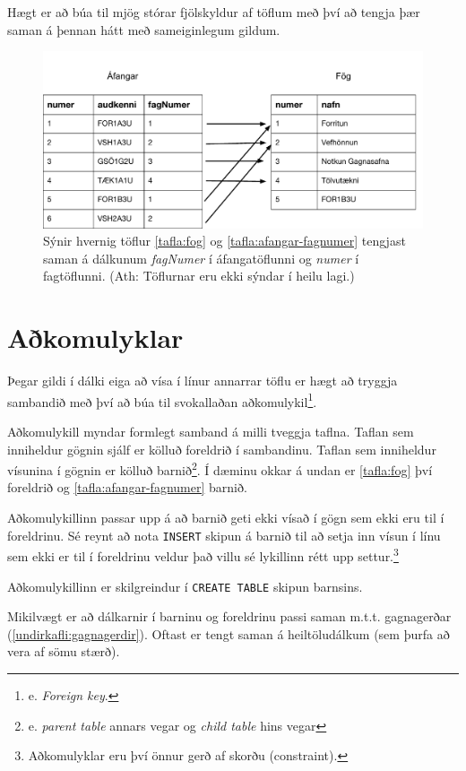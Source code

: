 Hægt er að búa til mjög stórar fjölskyldur af töflum með því að tengja þær saman á þennan hátt með sameiginlegum gildum.

\begin{figure}
\caption[Tengsl taflna]{Sýnir hvernig töflur \ref{tafla:fog} og \ref{tafla:afangar-fagnumer} tengjast saman á dálkunum \emph{fagNumer} í áfangatöflunni og \emph{numer} í fagtöflunni. (Ath: Töflurnar eru ekki sýndar í heilu lagi.)}
\label{mynd:tengsl}
\centering
\includegraphics[width=\linewidth]{myndir/foreign-key}
\end{figure}

\section{Aðkomulyklar} %
\label{undirkafli:adkomulyklar}
Þegar gildi í dálki eiga að vísa í línur annarrar töflu er hægt að tryggja sambandið með því að búa til svokallaðan aðkomulykil\footnote{e. \emph{Foreign key}.}.

Aðkomulykill myndar formlegt samband á milli tveggja taflna. Taflan sem inniheldur gögnin sjálf er kölluð foreldrið í sambandinu. Taflan sem inniheldur vísunina í gögnin er kölluð barnið\footnote{e. \emph{parent table} annars vegar og \emph{child table} hins vegar}. Í dæminu okkar á undan er \ref{tafla:fog} því foreldrið og \ref{tafla:afangar-fagnumer} barnið.

Aðkomulykillinn passar upp á að barnið geti ekki vísað í gögn sem ekki eru til í foreldrinu. Sé reynt að nota \verb|INSERT| skipun á barnið til að setja inn vísun í línu sem ekki er til í foreldrinu veldur það villu sé lykillinn rétt upp settur.\footnote{Aðkomulyklar eru því önnur gerð af skorðu (constraint).}

Aðkomulykillinn er skilgreindur í \verb|CREATE TABLE| skipun barnsins.

Mikilvægt er að dálkarnir í barninu og foreldrinu passi saman m.t.t. gagnagerðar (\ref{undirkafli:gagnagerdir}). Oftast er tengt saman á heiltöludálkum (sem þurfa að vera af sömu stærð).

